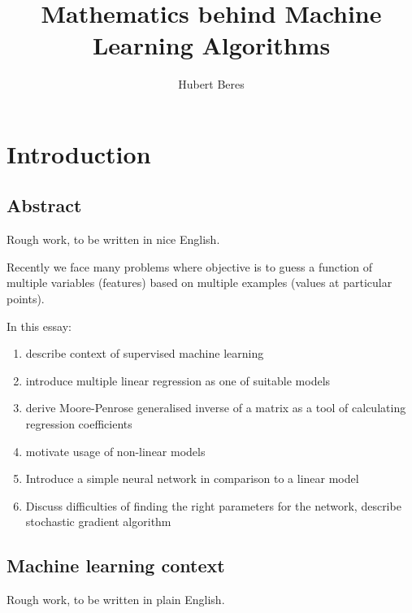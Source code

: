 \documentclass[a4paper]{article}
\title{Mathematics behind Machine Learning Algorithms}
\author{Hubert Beres}
\theoremstyle{break}
\begin{document}
\maketitle

\section{Introduction}

\subsection{Abstract}
Rough work, to be written in nice English.

Recently we face many problems where objective is to guess a function of multiple variables (features) based on multiple examples (values at particular points).

In this essay:

\begin{enumerate}
    \item describe context of supervised machine learning
    \item introduce multiple linear regression as one of suitable models
    \item derive Moore-Penrose generalised inverse of a matrix as a tool of calculating regression coefficients
    \item motivate usage of non-linear models
    \item Introduce a simple neural network in comparison to a linear model
    \item Discuss difficulties of finding the right parameters for the network, describe stochastic gradient algorithm
\end{enumerate}

\subsection{Machine learning context}

Rough work, to be written in plain English.
\end{document}
